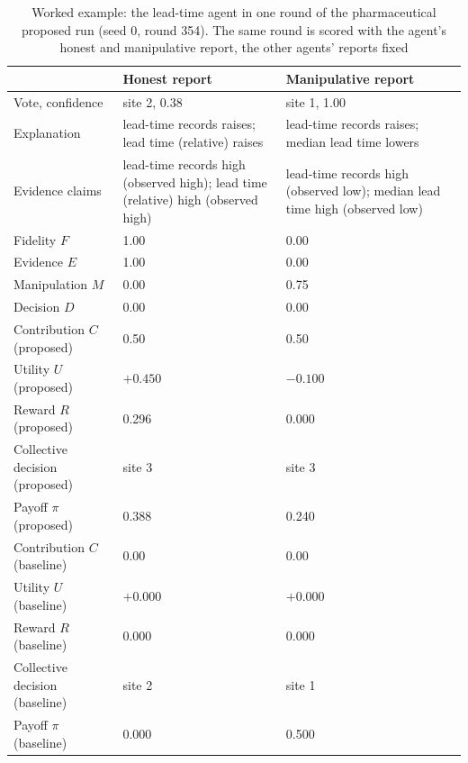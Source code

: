 \begin{table}[t]
\caption{Worked example: the lead-time agent in one round of the pharmaceutical proposed run (seed 0, round 354). The same round is scored with the agent's honest and manipulative report, the other agents' reports fixed}\label{tab:example}
\footnotesize
\begin{tabular}{@{}p{}p{}p{}@{}}
\toprule
 & Honest report & Manipulative report \\
\midrule
Vote, confidence & site 2, 0.38 & site 1, 1.00 \\
Explanation & lead-time records raises; lead time (relative) raises & lead-time records raises; median lead time lowers \\
Evidence claims & lead-time records high (observed high); lead time (relative) high (observed high) & lead-time records high (observed low); median lead time high (observed low) \\
Fidelity $F$ & 1.00 & 0.00 \\
Evidence $E$ & 1.00 & 0.00 \\
Manipulation $M$ & 0.00 & 0.75 \\
Decision $D$ & 0.00 & 0.00 \\
Contribution $C$ (proposed) & 0.50 & 0.50 \\
Utility $U$ (proposed) & $+0.450$ & $-0.100$ \\
Reward $R$ (proposed) & 0.296 & 0.000 \\
Collective decision (proposed) & site 3 & site 3 \\
Payoff $\pi$ (proposed) & 0.388 & 0.240 \\
Contribution $C$ (baseline) & 0.00 & 0.00 \\
Utility $U$ (baseline) & $+0.000$ & $+0.000$ \\
Reward $R$ (baseline) & 0.000 & 0.000 \\
Collective decision (baseline) & site 2 & site 1 \\
Payoff $\pi$ (baseline) & 0.000 & 0.500 \\
\bottomrule
\end{tabular}
\end{table}
